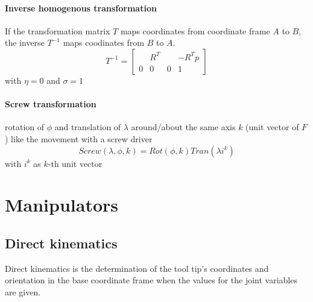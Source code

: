\documentclass[12pt]{article}
\begin{document}
	\paragraph{Inverse homogenous transformation} If the transformation matrix $T$ maps coordinates from coordinate frame $A$ to $B$, the inverse $T^{-1}$ maps coodinates from $B$ to $A$.
	\begin{equation}
	T^{-1} = 
	\begin{bmatrix}
	& R^T & & -R^T p\\
	0 & 0 & 0 & 1
	\end{bmatrix}
	\end{equation}
	with $\eta = 0$ and $\sigma = 1$
	
	\paragraph{Screw transformation} rotation of $\phi$ and translation of $\lambda$ around/about the same axis $k$ (unit vector of $F$) like the movement with a screw driver
	\begin{equation}
	Screw(\lambda,\phi,k) = Rot(\phi , k) Tran(\lambda i^k)
	\end{equation}
	with $i^k$ as $k$-th unit vector
	
	\section{Manipulators}
	\subsection{Direct kinematics}
	Direct kinematics is the determination of the tool tip's coordinates and orientation in the base coordinate frame when the values for the joint variables are given.
\end{document}
